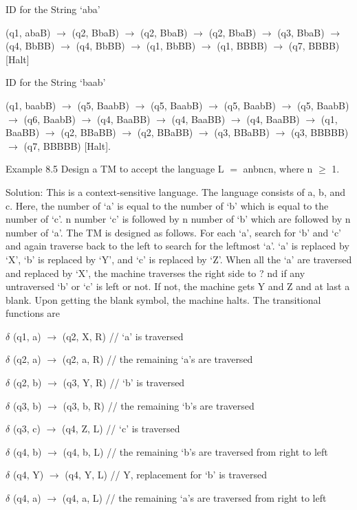 \documentclass{article}
\begin{document}
ID for the String `aba'

\begin{center}
(q1, abaB) $\to $ (q2, BbaB) $\to $ (q2, BbaB) $\to $ (q2, BbaB) $\to $ (q3,
BbaB) $\to $ (q4, BbBB) $\to $ (q4, BbBB) $\to $ (q1, BbBB) $\to $ (q1,
BBBB) $\to $ (q7, BBBB) [Halt]
\end{center}

ID for the String `baab'

\begin{center}
(q1, baabB) $\to $ (q5, BaabB) $\to $ (q5, BaabB) $\to $ (q5, BaabB) $\to $
(q5, BaabB) $\to $ (q6, BaabB) $\to $ (q4, BaaBB) $\to $ (q4, BaaBB) $\to $
(q4, BaaBB) $\to $ (q1, BaaBB) $\to $ (q2, BBaBB) $\to $ (q2, BBaBB) $\to $
(q3, BBaBB) $\to $ (q3, BBBBB) $\to $ (q7, BBBBB) [Halt].
\end{center}

Example 8.5 Design a TM to accept the language L $=$ anbncn, where n $\ge $
1.

Solution: This is a context-sensitive language. The language consists of a,
b, and c. Here, the number of `a' is equal to the number of `b' which is
equal to the number of `c'. n number `c' is followed by n number of `b'
which are followed by n number of `a'. The TM is designed as follows. For
each `a', search for `b' and `c' and again traverse back to the left to
search for the leftmost `a'. `a' is replaced by `X', `b' is replaced by `Y',
and `c' is replaced by `Z'. When all the `a' are traversed and replaced by
`X', the machine traverses the right side to ? nd if any untraversed `b' or
`c' is left or not. If not, the machine gets Y and Z and at last a blank.
Upon getting the blank symbol, the machine halts. The transitional functions
are

$\delta $ (q1, a) $\to $ (q2, X, R) // `a' is traversed

$\delta $ (q2, a) $\to $ (q2, a, R) // the remaining `a's are traversed

$\delta $ (q2, b) $\to $ (q3, Y, R) // `b' is traversed

$\delta $ (q3, b) $\to $ (q3, b, R) // the remaining `b's are traversed

$\delta $ (q3, c) $\to $ (q4, Z, L) // `c' is traversed

$\delta $ (q4, b) $\to $ (q4, b, L) // the remaining `b's are traversed from
right to left

$\delta $ (q4, Y) $\to $ (q4, Y, L) // Y, replacement for `b' is traversed

$\delta $ (q4, a) $\to $ (q4, a, L) // the remaining `a's are traversed from
right to left
\end{document}

